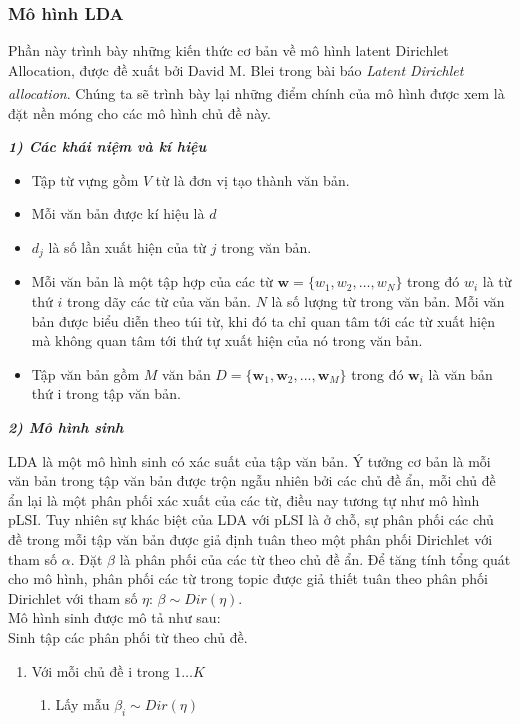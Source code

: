 \documentclass[fontsize=13pt]{scrartcl}
\begin{document}
\subsubsection{Mô hình LDA}
Phần này trình bày những kiến thức cơ bản về mô hình latent Dirichlet Allocation, được đề xuất bởi David M. Blei trong bài báo \textit{Latent Dirichlet allocation}\textsuperscript{\cite{blei2003latent}}. Chúng ta sẽ trình bày lại những điểm chính của mô hình được xem là đặt nền móng cho các mô hình chủ đề này.
\par
\textbf{\textit{1) Các khái niệm và kí hiệu}}
\begin{itemize}
\item Tập từ vựng gồm $V$ từ là đơn vị tạo thành văn bản.
\item Mỗi văn bản được kí hiệu là $d$
\item $d_j$ là số lần xuất hiện của từ $j$ trong văn bản.
\item Mỗi văn bản là một tập hợp của các từ $\textbf{w}= \{ w_1,w_2,…,w_N\}$ trong đó $w_i$ là từ thứ $i$ trong dãy các từ của văn bản. $N$ là số lượng từ trong văn bản. Mỗi văn bản được biểu diễn theo túi từ, khi đó ta chỉ quan tâm tới các từ xuất hiện mà không quan tâm tới thứ tự xuất hiện của nó trong văn bản.
\item Tập văn bản gồm $M$ văn bản $ D = \{\textbf{w}_1,\textbf{w}_2,...,\textbf{w}_M\}$ trong đó $\textbf{w}_i$ là văn bản thứ i trong tập văn bản.


\end{itemize}
\textbf{\textit{2) Mô hình sinh}}
\par
LDA là một mô hình sinh có xác suất của tập văn bản. Ý tưởng cơ bản là mỗi văn bản trong tập văn bản được trộn ngẫu nhiên bởi các chủ đề ẩn, mỗi chủ đề ẩn lại là một phân phối xác xuất của các từ, điều nay tương tự như mô hình pLSI. Tuy nhiên sự khác biệt của LDA với pLSI là ở chỗ, sự phân phối các chủ đề trong mỗi tập văn bản được giả định tuân theo một phân phối Dirichlet với tham số $\alpha$. Đặt $\beta$ là phân phối của các từ theo chủ đề ẩn. Để tăng tính tổng quát cho mô hình, phân phối các từ trong topic được giả thiết tuân theo phân phối Dirichlet với tham số $\eta$: $\beta \sim Dir(\eta)$. \\
Mô hình sinh được mô tả như sau:\\
Sinh tập các phân phối từ theo chủ đề.
\begin{enumerate}
\item Với mỗi chủ đề i trong ${1\ldots K}$
	\begin{enumerate}
		\item Lấy mẫu $\beta_i \sim Dir(\eta)$ 
	\end{enumerate}

\end{enumerate}
\end{document}
